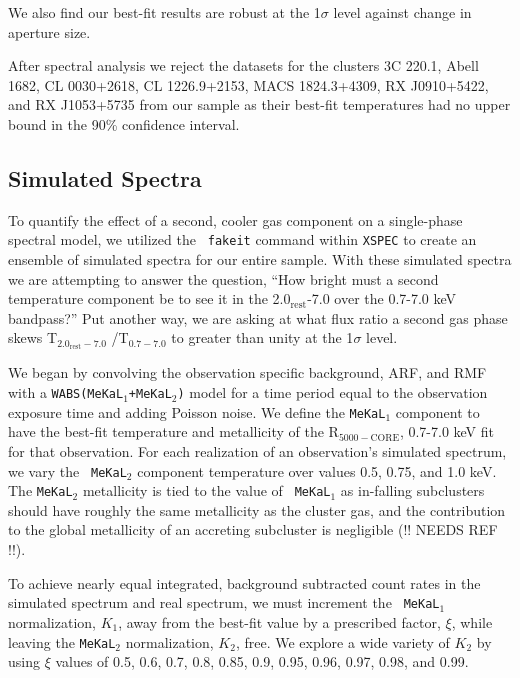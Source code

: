\documentclass{emulateapj}
\newcommand{\hard}{T$_{2.0_{\text{rest}}-7.0}$ }
\newcommand{\full}{T$_{0.7-7.0}$ }
\begin{document}
We also find our best-fit results are robust at the 1$\sigma$ level
against change in aperture size.

After spectral analysis we reject the datasets for the clusters 3C
220.1, Abell 1682, CL 0030+2618, CL 1226.9+2153, MACS 1824.3+4309, RX
J0910+5422, and RX J1053+5735 from our sample as their best-fit
temperatures had no upper bound in the 90\% confidence interval.

\subsection{Simulated Spectra}\label{sec:simulated}

To quantify the effect of a second, cooler gas
component on a single-phase spectral model, we utilized the {\tt
fakeit} command within {\tt XSPEC} to create an ensemble of simulated
spectra for our entire sample. With these simulated spectra we are
attempting to answer the question, ``How bright must a second
temperature component be to see it in the 2.0$_{\text{rest}}$-7.0 over the
0.7-7.0 keV bandpass?'' Put another way, we are asking at what
flux ratio a second gas phase skews \hard/\full to
greater than unity at the 1$\sigma$ level.

We began by convolving the observation specific background, ARF, and RMF
with a {\tt WABS(MeKaL$_{1}$+MeKaL$_{2}$)} model for a time period equal to
the observation exposure time and adding Poisson noise. We define the
{\tt MeKaL$_1$} component to have the best-fit temperature and metallicity of
the R$_{5000-\text{CORE}}$, 0.7-7.0 keV fit for that observation.
For each realization of an observation's simulated spectrum, we vary the {\tt
MeKaL$_2$} component temperature over values 0.5, 0.75, and 1.0 keV.
The {\tt MeKaL$_2$} metallicity is tied to the value of {\tt
MeKaL$_1$} as in-falling subclusters should have roughly the same
metallicity as the cluster gas, and the contribution to the global
metallicity of an accreting subcluster is negligible (!! NEEDS REF !!).

To achieve nearly equal integrated, background subtracted count rates
in the simulated spectrum and real spectrum, we must increment the {\tt
MeKaL$_1$} normalization, $K_1$, away from the best-fit value by a
prescribed factor, $\xi$, while leaving the {\tt MeKaL$_2$}
normalization, $K_2$, free. We explore a wide variety of
$K_2$ by using $\xi$ values of 0.5, 0.6,
0.7, 0.8, 0.85, 0.9, 0.95, 0.96, 0.97, 0.98, and 0.99.
\end{document}
